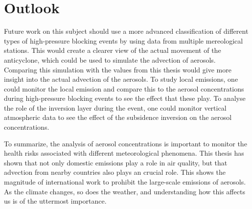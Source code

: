 \section{Outlook}
Future work on this subject should use a more advanced classification of different types of high-pressure blocking events by using data from multiple mereological stations. This would create a clearer view of the actual movement of the anticyclone, which could be used to simulate the advection of aerosols. Comparing this simulation with the values from this thesis would give more insight into the actual advection of the aerosols. To study local emissions, one could monitor the local emission and compare this to the aerosol concentrations during high-pressure blocking events to see the effect that these play. To analyse the role of the inversion layer during the event, one could monitor vertical atmospheric data to see the effect of the subsidence inversion on the aerosol concentrations.

To summarize, the analysis of aerosol concentrations is important to monitor the health risks associated with different meteorological phenomena. This thesis has shown that not only domestic emissions play a role in air quality, but that advection from nearby countries also plays an crucial role. This shows the magnitude of international work to prohibit the large-scale emissions of aerosols. As the climate changes, so does the weather, and understanding how this affects us is of the uttermost importance.

